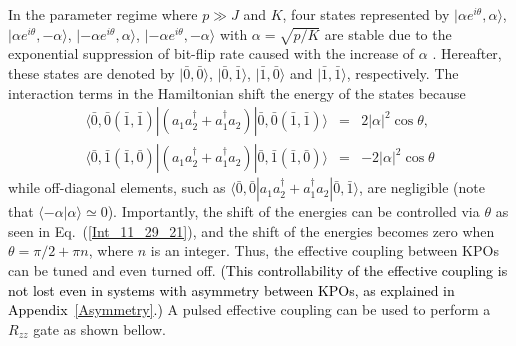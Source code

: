 \documentclass[%
 reprint,
 amsmath,amssymb,
 aps,
pra,
]{revtex4-2}
\begin{document}
In the parameter regime where $p\gg J$ and $K$,
four states represented by $|\alpha e^{i\theta},\alpha \rangle$, $|\alpha e^{i\theta},-\alpha \rangle$, $|-\alpha e^{i\theta},\alpha \rangle$, $|-\alpha e^{i\theta},-\alpha \rangle$ with $\alpha=\sqrt{p/K}$ are stable due to the exponential suppression of bit-flip rate caused with the increase of $\alpha$ \cite{Puri2019}.
Hereafter, these states are denoted by $|\bar{0},\bar{0}\rangle$, $|\bar{0},\bar{1}\rangle$, $|\bar{1},\bar{0}\rangle$ and $|\bar{1},\bar{1}\rangle$, respectively.
The interaction terms in the Hamiltonian shift the energy of the states because 
\begin{eqnarray}
\langle \bar{0},\bar{0} (\bar{1},\bar{1})| (a_1 a_2^\dagger + a_1^\dagger a_2) |  \bar{0},\bar{0} (\bar{1},\bar{1}) \rangle
&=& 2|\alpha|^2 \cos\theta, \nonumber\\
\langle \bar{0},\bar{1} (\bar{1},\bar{0}) | (a_1 a_2^\dagger + a_1^\dagger a_2) |  \bar{0},\bar{1} (\bar{1},\bar{0}) \rangle
&=& - 2|\alpha|^2 \cos\theta 
\label{Int_11_29_21}
\end{eqnarray}
while off-diagonal elements, such as 
$\langle \bar{0},  \bar{0}  | a_1 a_2^\dagger + a_1^\dagger a_2 |  \bar{0},  \bar{1} \rangle$, are negligible (note that $\langle -\alpha| \alpha \rangle\simeq 0$).
Importantly, the shift of the energies can be controlled via $\theta$ as seen in Eq.~(\ref{Int_11_29_21}), and the shift of the energies becomes zero when $\theta = \pi/2 + \pi n$, where $n$ is an integer.
Thus, the effective coupling between KPOs can be tuned and even turned off. 
\textcolor{black}{(This controllability of the effective coupling is not lost even in systems with asymmetry between KPOs, as explained in Appendix~\ref{Asymmetry}.)}
A pulsed effective coupling can be used to perform a $R_{zz}$ gate as shown bellow. 
\end{document}
